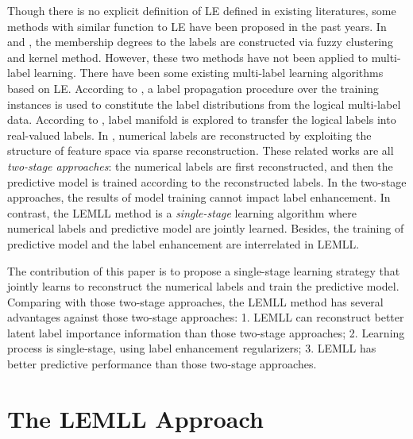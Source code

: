 \documentclass[conference]{IEEEtran}
\begin{document}
Though there is no explicit definition of LE defined in existing literatures, some methods with similar function to LE have been proposed in the past years. In \cite{el2006study} and \cite{jiang2006fuzzy}, the membership degrees to the labels are constructed via fuzzy clustering \cite{keller1985fuzzy} and kernel method. However, these two methods have not been applied to multi-label learning. There have been some existing multi-label learning algorithms based on LE. According to \cite{li2015leveraging}, a label propagation procedure over the training instances is used to constitute the label distributions from the logical multi-label data. According to \cite{hou2016multi}, label manifold is explored to transfer the logical labels into real-valued labels. In \cite{zhang2018feature}, numerical labels are reconstructed by exploiting the structure of feature space via sparse reconstruction. These related works are all \emph{two-stage approaches}: the numerical labels are first reconstructed, and then the predictive model is trained according to the reconstructed labels. In the two-stage approaches, the results of model training cannot impact label enhancement. In contrast, the LEMLL method is a \emph{single-stage} learning algorithm where numerical labels and predictive model are jointly learned. Besides, the training of predictive model and the label enhancement are interrelated in LEMLL.

The contribution of this paper is to propose a single-stage learning strategy that jointly learns to reconstruct the numerical labels and train the predictive model. Comparing with those two-stage approaches, the LEMLL method has several advantages against those two-stage approaches: 1. LEMLL can reconstruct better latent label importance information than those two-stage approaches; 2. Learning process is single-stage, using label enhancement regularizers; 3. LEMLL has better predictive performance than those two-stage approaches.


\section{The LEMLL Approach}
\end{document}
